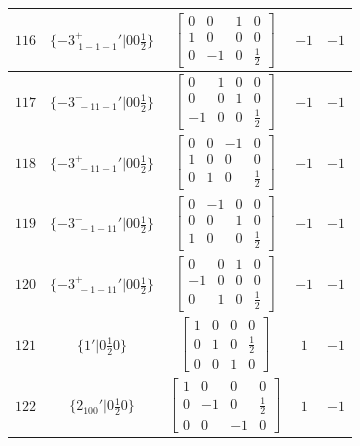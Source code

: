 \documentclass[fleqn,8pt]{jsarticle}
\begin{document}
\begin{longtable}{ccccc}
$ 116 $ & $ \{-3^{+}_{\,\,1-1-1}{}'|0 0 \frac{1}{2}\} $ & $ \begin{bmatrix} 0 & 0 & 1 & 0 \\ 1 & 0 & 0 & 0 \\ 0 & -1 & 0 & \frac{1}{2} \end{bmatrix} $ & $ -1 $ & $ -1 $ \\ \hline
$ 117 $ & $ \{-3^{-}_{\,\,-11-1}{}'|0 0 \frac{1}{2}\} $ & $ \begin{bmatrix} 0 & 1 & 0 & 0 \\ 0 & 0 & 1 & 0 \\ -1 & 0 & 0 & \frac{1}{2} \end{bmatrix} $ & $ -1 $ & $ -1 $ \\ \hline
$ 118 $ & $ \{-3^{+}_{\,\,-11-1}{}'|0 0 \frac{1}{2}\} $ & $ \begin{bmatrix} 0 & 0 & -1 & 0 \\ 1 & 0 & 0 & 0 \\ 0 & 1 & 0 & \frac{1}{2} \end{bmatrix} $ & $ -1 $ & $ -1 $ \\ \hline
$ 119 $ & $ \{-3^{-}_{\,\,-1-11}{}'|0 0 \frac{1}{2}\} $ & $ \begin{bmatrix} 0 & -1 & 0 & 0 \\ 0 & 0 & 1 & 0 \\ 1 & 0 & 0 & \frac{1}{2} \end{bmatrix} $ & $ -1 $ & $ -1 $ \\ \hline
$ 120 $ & $ \{-3^{+}_{\,\,-1-11}{}'|0 0 \frac{1}{2}\} $ & $ \begin{bmatrix} 0 & 0 & 1 & 0 \\ -1 & 0 & 0 & 0 \\ 0 & 1 & 0 & \frac{1}{2} \end{bmatrix} $ & $ -1 $ & $ -1 $ \\ \hline
$ 121 $ & $ \{1{}'|0 \frac{1}{2} 0\} $ & $ \begin{bmatrix} 1 & 0 & 0 & 0 \\ 0 & 1 & 0 & \frac{1}{2} \\ 0 & 0 & 1 & 0 \end{bmatrix} $ & $ 1 $ & $ -1 $ \\ \hline
$ 122 $ & $ \{2{}_{100}{}'|0 \frac{1}{2} 0\} $ & $ \begin{bmatrix} 1 & 0 & 0 & 0 \\ 0 & -1 & 0 & \frac{1}{2} \\ 0 & 0 & -1 & 0 \end{bmatrix} $ & $ 1 $ & $ -1 $ \\ \hline

\end{longtable}
\end{document}

